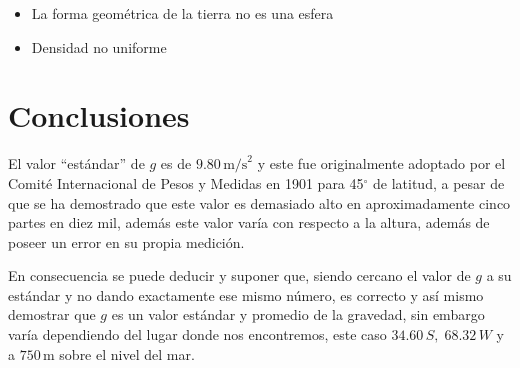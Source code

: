 \documentclass[a4paper,twocolumn]{article}
\begin{document}
\begin{itemize}
    \item La forma geométrica de la tierra no es una esfera\cite{b11}
    \item Densidad no uniforme~\cite{b11}
\end{itemize}

\section{Conclusiones}

El valor ``estándar'' de $g$ es de $9.80\,\mathrm{m/s}^{2}$ y este fue originalmente adoptado por el Comité Internacional de Pesos y Medidas en 1901\cite{b9} para 45$^\circ$ de latitud, a pesar de que se ha demostrado que este valor es demasiado alto en aproximadamente cinco partes en diez mil\cite{b9}, además este valor varía con respecto a la altura, además de poseer un error en su propia medición.

En consecuencia se puede deducir y suponer que, siendo cercano el valor de $g$ a su estándar y no dando exactamente ese mismo número, es correcto y así mismo demostrar que $g$ es un valor estándar y promedio de la gravedad, sin embargo varía dependiendo del lugar donde nos encontremos, este caso $34.60\,S,\;68.32\,W$ y a $750\,\mathrm{m}$ sobre el nivel del mar.

\end{document}
